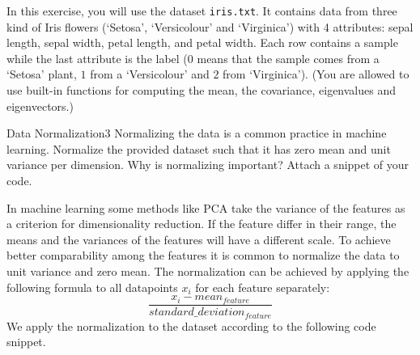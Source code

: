 \newif\ifvimbug
\vimbugfalse

\ifvimbug

\fi

In this exercise, you will use the dataset \texttt{iris.txt}. It contains data from three kind of Iris flowers (`Setosa', `Versicolour' and `Virginica') with 4 attributes: sepal length, sepal width, petal length, and petal width. Each row contains a sample while the last attribute is the label ($0$ means that the sample comes from a `Setosa' plant, $1$ from a `Versicolour' and $2$ from `Virginica').
(You are allowed to use built-in functions for computing the mean, the covariance, eigenvalues and eigenvectors.)

\begin{questions}


\begin{question}{Data Normalization}{3}
Normalizing the data is a common practice in machine learning. Normalize the provided dataset such that it has zero mean and unit variance per dimension. Why is normalizing important?
Attach a snippet of your code. 

\begin{answer}
In machine learning some methods like PCA take the variance of the features as a criterion for dimensionality reduction. If the feature differ in their range, the means and the variances of the features will have a different scale. To achieve better comparability among the features it is common to normalize the data to unit variance and zero mean. The normalization can be achieved by applying the following formula to all datapoints $x_i$ for each feature separately:
\begin{equation*}
\frac{x_i-mean_{feature}}{standard\_deviation_{feature}}
\end{equation*}
We apply the normalization to the dataset according to the following code snippet.

\end{answer}

\end{question}



\end{questions}
